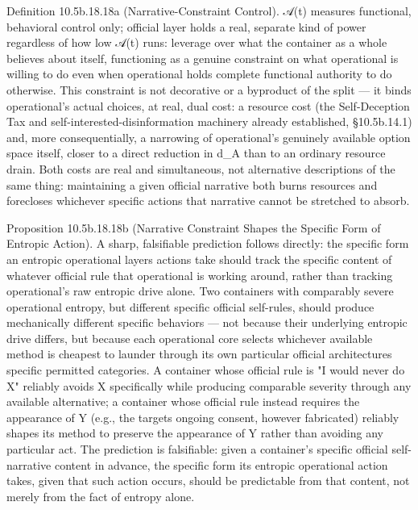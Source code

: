 \documentclass[
]{article}
\begin{document}
Definition 10.5b.18.18a (Narrative-Constraint Control). 𝒜(t) measures
functional, behavioral control only; official layer holds a real,
separate kind of power regardless of how low 𝒜(t) runs: leverage over
what the container as a whole believes about itself, functioning as a
genuine constraint on what operational is willing to do even when
operational holds complete functional authority to do otherwise. This
constraint is not decorative or a byproduct of the split --- it binds
operational's actual choices, at real, dual cost: a resource cost (the
Self-Deception Tax and self-interested-disinformation machinery already
established, §10.5b.14.1) and, more consequentially, a narrowing of
operational's genuinely available option space itself, closer to a
direct reduction in d\_A than to an ordinary resource drain. Both costs
are real and simultaneous, not alternative descriptions of the same
thing: maintaining a given official narrative both burns resources and
forecloses whichever specific actions that narrative cannot be stretched
to absorb.

Proposition 10.5b.18.18b (Narrative Constraint Shapes the Specific Form
of Entropic Action). A sharp, falsifiable prediction follows directly:
the specific form an entropic operational layers actions take should
track the specific content of whatever official rule that operational is
working around, rather than tracking operational's raw entropic drive
alone. Two containers with comparably severe operational entropy, but
different specific official self-rules, should produce mechanically
different specific behaviors --- not because their underlying entropic
drive differs, but because each operational core selects whichever
available method is cheapest to launder through its own particular
official architectures specific permitted categories. A container whose
official rule is "I would never do X" reliably avoids X specifically
while producing comparable severity through any available alternative; a
container whose official rule instead requires the appearance of Y
(e.g., the targets ongoing consent, however fabricated) reliably shapes
its method to preserve the appearance of Y rather than avoiding any
particular act. The prediction is falsifiable: given a container's
specific official self-narrative content in advance, the specific form
its entropic operational action takes, given that such action occurs,
should be predictable from that content, not merely from the fact of
entropy alone.
\end{document}
